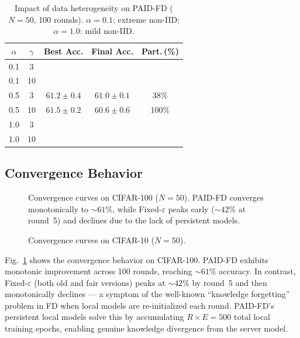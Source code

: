 \begin{table}[t]
\centering
\caption{Impact of data heterogeneity on PAID-FD ($N = 50$, 100 rounds).
$\alpha = 0.1$: extreme non-IID; $\alpha = 1.0$: mild non-IID.}
\label{tab:noniid}
\begin{tabular}{ccccc}
\toprule
$\alpha$ & $\gamma$ & Best Acc. & Final Acc. & Part.\,(\%) \\
\midrule
0.1 & 3  & \placeholder{} & \placeholder{} & \placeholder{} \\
0.1 & 10 & \placeholder{} & \placeholder{} & \placeholder{} \\
0.5 & 3  & $61.2 \pm 0.4$ & $61.0 \pm 0.1$ & 38\% \\
0.5 & 10 & $61.5 \pm 0.2$ & $60.6 \pm 0.6$ & 100\% \\
1.0 & 3  & \placeholder{} & \placeholder{} & \placeholder{} \\
1.0 & 10 & \placeholder{} & \placeholder{} & \placeholder{} \\
\bottomrule
\end{tabular}
\end{table}

\subsection{Convergence Behavior}\label{sec:convergence}

\begin{figure}[t]
\centering
\caption{Convergence curves on CIFAR-100 ($N = 50$). PAID-FD converges
monotonically to $\sim\!61\%$, while Fixed-$\varepsilon$ peaks early
($\sim\!42\%$ at round~5) and declines due to the lack of persistent models.}
\label{fig:convergence}
\end{figure}

\begin{figure}[t]
\centering
\caption{Convergence curves on CIFAR-10 ($N = 50$).}
\label{fig:convergence_cifar10}
\end{figure}

Fig.~\ref{fig:convergence} shows the convergence behavior on CIFAR-100.
PAID-FD exhibits monotonic improvement across 100 rounds, reaching
$\sim\!61\%$ accuracy.
In contrast, Fixed-$\varepsilon$ (both old and fair versions) peaks at
$\sim\!42\%$ by round~5 and then monotonically declines —
a symptom of the well-known ``knowledge forgetting'' problem in FD
when local models are re-initialized each round.
PAID-FD's persistent local models solve this by accumulating
$R \times E = 500$ total local training epochs, enabling genuine
knowledge divergence from the server model.

